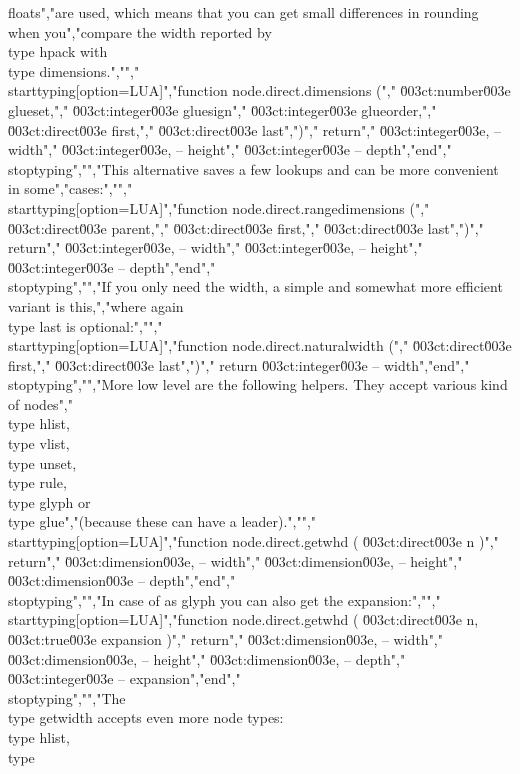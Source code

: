 floats","are used, which means that you can get small differences in rounding when you","compare the width reported by \\type {hpack} with \\type {dimensions}.","","\\starttyping[option=LUA]","function node.direct.dimensions (","    \u003ct:number\u003e  glueset,","    \u003ct:integer\u003e gluesign","    \u003ct:integer\u003e glueorder,","    \u003ct:direct\u003e  first,","    \u003ct:direct\u003e  last",")","    return","        \u003ct:integer\u003e, -- width","        \u003ct:integer\u003e, -- height","        \u003ct:integer\u003e  -- depth","end","\\stoptyping","","This alternative saves a few lookups and can be more convenient in some","cases:","","\\starttyping[option=LUA]","function node.direct.rangedimensions (","    \u003ct:direct\u003e parent,","    \u003ct:direct\u003e first,","    \u003ct:direct\u003e last",")","    return","        \u003ct:integer\u003e, -- width","        \u003ct:integer\u003e, -- height","        \u003ct:integer\u003e  -- depth","end","\\stoptyping","","If you only need the width, a simple and somewhat more efficient variant is this,","where again \\type {last} is optional:","","\\starttyping[option=LUA]","function node.direct.naturalwidth (","    \u003ct:direct\u003e first,","    \u003ct:direct\u003e last",")","    return \u003ct:integer\u003e -- width","end","\\stoptyping","","More low level are the following helpers. They accept various kind of nodes","\\type {hlist}, \\type {vlist}, \\type {unset}, \\type {rule}, \\type {glyph} or \\type {glue}","(because these can have a leader).","","\\starttyping[option=LUA]","function node.direct.getwhd ( \u003ct:direct\u003e n )","    return","        \u003ct:dimension\u003e, -- width","        \u003ct:dimension\u003e, -- height","        \u003ct:dimension\u003e  -- depth","end","\\stoptyping","","In case of as glyph you can also get the expansion:","","\\starttyping[option=LUA]","function node.direct.getwhd ( \u003ct:direct\u003e n, \u003ct:true\u003e expansion )","    return","        \u003ct:dimension\u003e, -- width","        \u003ct:dimension\u003e, -- height","        \u003ct:dimension\u003e, -- depth","        \u003ct:integer\u003e    -- expansion","end","\\stoptyping","","The \\type {getwidth} accepts even more node types: \\type {hlist}, \\type 